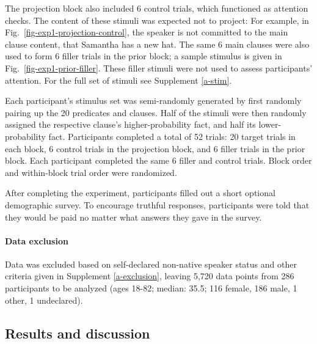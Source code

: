\documentclass[11pt,fleqn]{article}
\newcommand{\6}{\mbox{$[\hspace*{-.6mm}[$}}
\newcommand{\9}{\mbox{$]\hspace*{-.6mm}]$}}
\begin{document}

The projection block also included 6 control trials, which functioned as attention checks. The content of these stimuli was expected not to project: For example, in Fig.~\ref{fig-exp1-projection-control}, the speaker is not committed to the main clause content, that Samantha has a new hat. The same 6 main clauses were also used to form 6 filler trials in the prior block; a sample stimulus is given in Fig.~\ref{fig-exp1-prior-filler}. These filler stimuli were not used to assess participants' attention. For the full set of stimuli see Supplement \ref{a-stim}.


Each participant's stimulus set was semi-randomly generated by first randomly pairing up the 20 predicates and clauses. Half of the stimuli were then randomly assigned the respective clause's higher-probability fact, and half its lower-probability fact. Participants completed a total of 52 trials: 20 target trials in each block, 6 control trials in the projection block, and 6 filler trials in the prior block. Each participant completed the same 6 filler and control trials. Block order and within-block trial order were randomized.



After completing the experiment, participants filled out a short optional demographic survey. To encourage truthful responses, participants were told that they would be paid no matter what answers they gave in the survey.

\paragraph{Data exclusion} Data was excluded based on self-declared non-native speaker status and other criteria given in Supplement \ref{a-exclusion}, leaving 5,720 data points from 286 participants to be analyzed (ages 18-82; median: 35.5; 116 female, 186 male, 1 other, 1 undeclared).

\subsection{Results and discussion}
\end{document}
